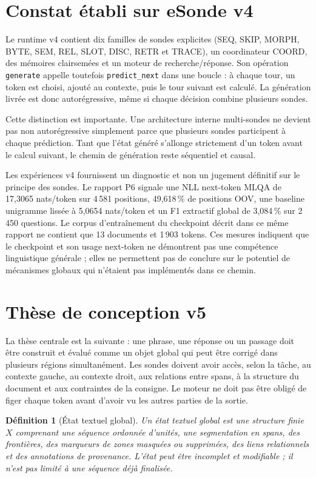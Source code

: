 \documentclass[11pt,a4paper,oneside]{report}
\newtheorem{definition}{Définition}[chapter]
\begin{document}
\section{Constat établi sur eSonde v4}
Le runtime v4 contient dix familles de sondes explicites (SEQ, SKIP, MORPH, BYTE, SEM, REL, SLOT, DISC, RETR et TRACE), un coordinateur COORD, des mémoires clairsemées et un moteur de recherche/réponse. Son opération \texttt{generate} appelle toutefois \texttt{predict\_next} dans une boucle : à chaque tour, un token est choisi, ajouté au contexte, puis le tour suivant est calculé. La génération livrée est donc autorégressive, même si chaque décision combine plusieurs sondes.

Cette distinction est importante. Une architecture interne multi-sondes ne devient pas non autorégressive simplement parce que plusieurs sondes participent à chaque prédiction. Tant que l'état généré s'allonge strictement d'un token avant le calcul suivant, le chemin de génération reste séquentiel et causal.

Les expériences v4 fournissent un diagnostic et non un jugement définitif sur le principe des sondes. Le rapport P6 signale une NLL next-token MLQA de 17,3065 nats/token sur 4\,581 positions, 49,618\,\% de positions OOV, une baseline unigramme lissée à 5,0654 nats/token et un F1 extractif global de 3,084\,\% sur 2\,450 questions. Le corpus d'entraînement du checkpoint décrit dans ce même rapport ne contient que 13 documents et 1\,903 tokens. Ces mesures indiquent que le checkpoint et son usage next-token ne démontrent pas une compétence linguistique générale ; elles ne permettent pas de conclure sur le potentiel de mécanismes globaux qui n'étaient pas implémentés dans ce chemin.

\section{Thèse de conception v5}
La thèse centrale est la suivante : une phrase, une réponse ou un passage doit être construit et évalué comme un objet global qui peut être corrigé dans plusieurs régions simultanément. Les sondes doivent avoir accès, selon la tâche, au contexte gauche, au contexte droit, aux relations entre spans, à la structure du document et aux contraintes de la consigne. Le moteur ne doit pas être obligé de figer chaque token avant d'avoir vu les autres parties de la sortie.

\begin{definition}[État textuel global]
Un état textuel global est une structure finie $X$ comprenant une séquence ordonnée d'unités, une segmentation en spans, des frontières, des marqueurs de zones masquées ou supprimées, des liens relationnels et des annotations de provenance. L'état peut être incomplet et modifiable ; il n'est pas limité à une séquence déjà finalisée.
\end{definition}
\end{document}
